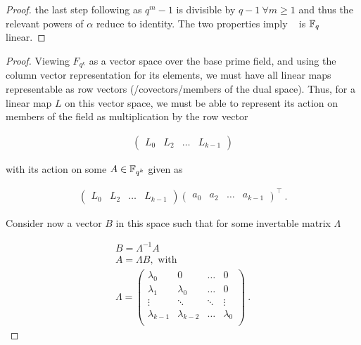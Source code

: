\begin{alphaparts}
\begin{proof}
        the last step following as \(q^m - 1\) is divisible by \(q-1~ \forall m \geq
        1\) and thus the relevant powers of \(\alpha\) reduce to identity. The two
        properties imply \tracemap~ is \(\mathbb{F}_q\) linear.
    \end{proof}

    \questionpart

    
    \begin{proof}
        Viewing \(F_{q^k}\) as a vector space over the base prime field, and using
        the column vector representation for its elements, we must have all linear
        maps representable as row vectors (/covectors/members of the dual space).
        Thus, for a linear map \(L\) on this vector space, we must be able to
        represent its action on members of the field as multiplication by the row
        vector
    
        \begin{gather*}
            \begin{pmatrix}
                L_0 & L_2 & \ldots & L_{k-1}
            \end{pmatrix}
        \end{gather*}
    
        with its action on some \(A \in \mathbb{F}_{q^k}\) given as
    
        \begin{gather*}
            \begin{pmatrix}
                L_0 & L_2 & \ldots & L_{k-1}
            \end{pmatrix}
            \begin{pmatrix}
                a_0 & a_2 & \ldots & a_{k-1}
            \end{pmatrix}^\top~.
        \end{gather*}
    
        Consider now a vector \(B\) in this space such that for some invertable
        matrix \(\Lambda\)
    
        \begin{gather*}
            B = \Lambda^{-1} A \\
            A = \Lambda B , \text{ with}\\
            \Lambda = 
            \begin{pmatrix}
                \lambda_0 & 0 & \ldots & 0 \\
                \lambda_1 & \lambda_0 & \ldots & 0 \\
                \vdots & \ddots & \ddots & \vdots\\
                \lambda_{k-1} & \lambda_{k-2} & \ldots & \lambda_0 \\
            \end{pmatrix}~.
        \end{gather*}
    

\end{proof}
\end{alphaparts}
